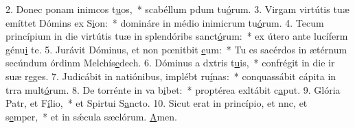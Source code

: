 2. Donec ponam inimcos t\uline{u}os,~* scabéllum pdum tu\uline{ó}rum.
3. Virgam virtútis tuæ emíttet Dómins ex S\uline{i}on:~* domináre in médio inimicrum tu\uline{ó}rum.
4. Tecum princípium in die virtútis tuæ in splendóribs sanct\uline{ó}rum:~* ex útero ante lucíferm génu\uline{i} te.
5. Jurávit Dóminus, et non pœnitbit \uline{e}um:~* Tu es sacérdos in ætérnum secúndum órdinm Melchís\uline{e}dech.
6. Dóminus a dxtris t\uline{u}is,~* confrégit in die ir suæ r\uline{e}ges.
7. Judicábit in natiónibus, implébt ru\uline{í}nas:~* conquassábit cápita in trra mult\uline{ó}rum.
8. De torrénte in va b\uline{i}bet:~* proptérea exltábit c\uline{a}put.
9. Glória Patr, et F\uline{í}lio,~* et Spirtui S\uline{a}ncto.
10. Sicut erat in princípio, et nnc, et s\uline{e}mper,~* et in sǽcula sæclórum. \uline{A}men.
